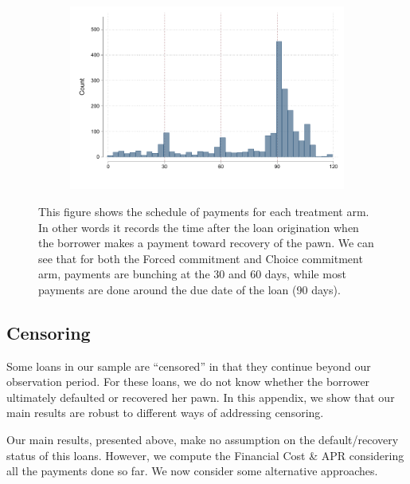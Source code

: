 \begin{figure}[H]
\begin{center}
\begin{subfigure}{0.45\textwidth}
        \includegraphics[width=\textwidth]{Figuras/hist_payments_cc.pdf}
    \end{subfigure}    
    \end{center}
     \scriptsize
     This figure shows the schedule of payments for each treatment arm. In other words it records the time after the loan origination when the borrower makes a payment toward recovery of the pawn. We can see that for both the Forced commitment and Choice commitment arm, payments are bunching at the 30 and 60 days, while most payments are done around the due date of the loan (90 days).
     
\end{figure}

\cleardoublepage


\subsection{Censoring} \label{App_censoring}

\vspace{.2in}

\normalsize
\linespread{1.25}
\normalsize
\linespread{1.25}

Some loans in our sample are ``censored'' in that they continue beyond our observation period.
For these loans, we do not know whether the borrower ultimately defaulted or recovered her pawn.
In this appendix, we show that our main results are robust to different ways of addressing censoring.

Our main results, presented above, make no assumption on the default/recovery status of this loans. However, we compute the Financial Cost \& APR considering all the payments done so far. We now consider some alternative approaches. \\
  

